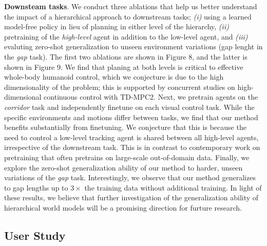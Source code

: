 \documentclass[sn-mathphys-num]{sn-jnl}%
\theoremstyle{thmstyleone}	%
\theoremstyle{thmstyletwo}	%
\theoremstyle{thmstylethree}	%
\begin{document}
\textbf{Downsteam tasks}.
We conduct three ablations that help us better understand the impact of a hierarchical approach to downstream tasks;
\textit{(i)} using a learned model-free policy in lieu of planning in either level of the hierarchy,
\textit{(ii)} pretraining of the \textit{high-level} agent in addition to the low-level agent, 
and \textit{(iii)} evaluting zero-shot generalization to unseen environment variations (gap lenght in the \textit{gap} task).
The first two ablations are shown in Figure 8, 
and the latter is shown in Figure 9.
We find that planing at both levels is critical to effective whole-body humanoid control,
which we conjecture is due to the high dimensionality of the problem;
this is supported by concurrent studies on high-dimensional continuous control with TD-MPC2.
Next, we pretrain agents on the \textit{corridor} task and independently finetune on each visual control task.
While the specific environments and motions differ between tasks, we find that our method benefits substantially from finetuning.
We conjecture that this is because the need to control a low-level tracking agent is shared between all high-level agents, irrespective of the downstream task.
This is in contrast to contemporary work on pretraining that often pretrains on large-scale out-of-domain data.
Finally, we explore the zero-shot generalization ability of our method to harder, unseen variations of the \textit{gap} task.
Interestingly, we observe that our method generalizes to gap lengths up to $ 3 \times $ the training data without additional training.
In light of these results, we believe that further investigation of the generalization ability of hierarchical world models will be a promising direction for furture research.




\subsection{User Study}
\end{document}
